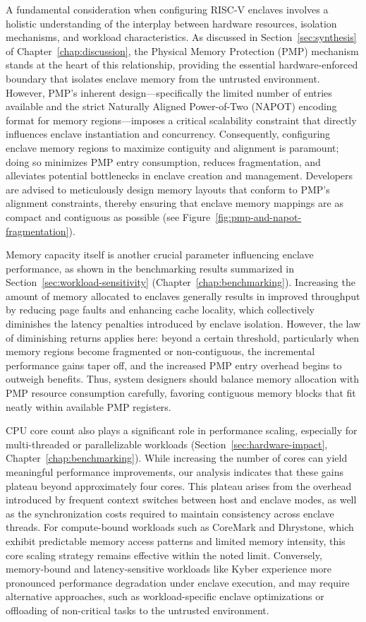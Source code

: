A fundamental consideration when configuring RISC-V enclaves involves a holistic understanding of the interplay between hardware resources, isolation mechanisms, and workload characteristics. As discussed in Section~\ref{sec:synthesis} of Chapter~\ref{chap:discussion}, the Physical Memory Protection (PMP) mechanism stands at the heart of this relationship, providing the essential hardware-enforced boundary that isolates enclave memory from the untrusted environment. However, PMP’s inherent design—specifically the limited number of entries available and the strict Naturally Aligned Power-of-Two (NAPOT) encoding format for memory regions—imposes a critical scalability constraint that directly influences enclave instantiation and concurrency. Consequently, configuring enclave memory regions to maximize contiguity and alignment is paramount; doing so minimizes PMP entry consumption, reduces fragmentation, and alleviates potential bottlenecks in enclave creation and management. Developers are advised to meticulously design memory layouts that conform to PMP’s alignment constraints, thereby ensuring that enclave memory mappings are as compact and contiguous as possible (see Figure~\ref{fig:pmp-and-napot-fragmentation}).

Memory capacity itself is another crucial parameter influencing enclave performance, as shown in the benchmarking results summarized in Section~\ref{sec:workload-sensitivity} (Chapter~\ref{chap:benchmarking}). Increasing the amount of memory allocated to enclaves generally results in improved throughput by reducing page faults and enhancing cache locality, which collectively diminishes the latency penalties introduced by enclave isolation. However, the law of diminishing returns applies here: beyond a certain threshold, particularly when memory regions become fragmented or non-contiguous, the incremental performance gains taper off, and the increased PMP entry overhead begins to outweigh benefits. Thus, system designers should balance memory allocation with PMP resource consumption carefully, favoring contiguous memory blocks that fit neatly within available PMP registers.

CPU core count also plays a significant role in performance scaling, especially for multi-threaded or parallelizable workloads (Section~\ref{sec:hardware-impact}, Chapter~\ref{chap:benchmarking}). While increasing the number of cores can yield meaningful performance improvements, our analysis indicates that these gains plateau beyond approximately four cores. This plateau arises from the overhead introduced by frequent context switches between host and enclave modes, as well as the synchronization costs required to maintain consistency across enclave threads. For compute-bound workloads such as CoreMark and Dhrystone, which exhibit predictable memory access patterns and limited memory intensity, this core scaling strategy remains effective within the noted limit. Conversely, memory-bound and latency-sensitive workloads like Kyber experience more pronounced performance degradation under enclave execution, and may require alternative approaches, such as workload-specific enclave optimizations or offloading of non-critical tasks to the untrusted environment.

